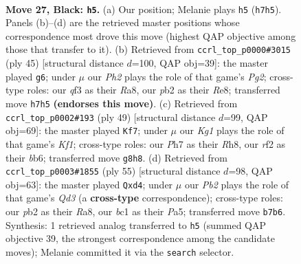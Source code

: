 \documentclass[11pt]{article}
\begin{document}
\clearpage

\begin{figure}[p]\centering
\begin{subfigure}{0.46\textwidth}\centering
\resizebox{\linewidth}{!}{%
\newchessgame
\chessboard[
  setfen={r5k1/pp2r2p/R3p1p1/8/6Pq/1N3Q2/1P3RB1/2B3K1 b - - 1 27},
  showmover=false,
  pgfstyle=straightmove, color=movearrow, markmove={h7-h5}
]}
\caption{}
\end{subfigure}\hfill
\begin{subfigure}{0.46\textwidth}\centering
\resizebox{\linewidth}{!}{%
\newchessgame
\chessboard[
  setfen={r3r1k1/1p3ppp/p7/3qP3/1b1p4/3Q1R2/P1B3PP/3R3K b - - 1 23},
  showmover=false,
  pgfstyle=straightmove, color=movearrow, markmove={g7-g6}
]}
\caption{}
\end{subfigure}
\\[4pt]
\begin{subfigure}{0.46\textwidth}\centering
\resizebox{\linewidth}{!}{%
\newchessgame
\chessboard[
  setfen={2r2k1r/6p1/pBq2p2/4R2p/4P1b1/8/PPP2Q1P/2K2R2 b - - 0 25},
  showmover=false,
  pgfstyle=straightmove, color=movearrow, markmove={f8-f7}
]}
\caption{}
\end{subfigure}\hfill
\begin{subfigure}{0.46\textwidth}\centering
\resizebox{\linewidth}{!}{%
\newchessgame
\chessboard[
  setfen={r1r3k1/6p1/1p1q3p/p4p2/b1pQR1P1/5N1P/5P2/2R2BK1 b - - 0 28},
  showmover=false,
  pgfstyle=straightmove, color=movearrow, markmove={d6-d4}
]}
\caption{}
\end{subfigure}
\caption{\textbf{Move 27, Black: \texttt{h5}.} (a) Our position; Melanie plays \texttt{h5} (\texttt{h7h5}). Panels (b)--(d) are the retrieved master positions whose correspondence most drove this move (highest QAP objective among those that transfer to it). (b) Retrieved from \texttt{ccrl\_top\_p0000\#3015} (ply 45) [structural distance $d$=100, QAP obj=39]: the master played \texttt{g6}; under $\mu$ our \emph{Ph2} plays the role of that game's \emph{Pg2}; cross-type roles: our \emph{q}f3 as their \emph{R}a8, our \emph{p}b2 as their \emph{R}e8; transferred move \texttt{h7h5} \textbf{(endorses this move)}. (c) Retrieved from \texttt{ccrl\_top\_p0002\#193} (ply 49) [structural distance $d$=99, QAP obj=69]: the master played \texttt{Kf7}; under $\mu$ our \emph{Kg1} plays the role of that game's \emph{Kf1}; cross-type roles: our \emph{P}h7 as their \emph{R}h8, our \emph{r}f2 as their \emph{b}b6; transferred move \texttt{g8h8}. (d) Retrieved from \texttt{ccrl\_top\_p0003\#1855} (ply 55) [structural distance $d$=98, QAP obj=63]: the master played \texttt{Qxd4}; under $\mu$ our \emph{Pb2} plays the role of that game's \emph{Qd3} (a \textbf{cross-type} correspondence); cross-type roles: our \emph{p}b2 as their \emph{R}a8, our \emph{b}c1 as their \emph{P}a5; transferred move \texttt{b7b6}. Synthesis: 1 retrieved analog transferred to \texttt{h5} (summed QAP objective 39, the strongest correspondence among the candidate moves); Melanie committed it via the \texttt{search} selector.}
\label{fig:thought-m53}
\end{figure}
\end{document}
